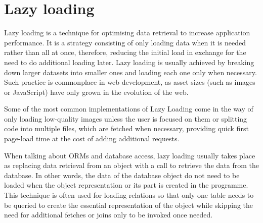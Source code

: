 \section{Lazy loading}
Lazy loading is a technique for optimising data retrieval to increase application performance. It is a strategy consisting of only loading data when it is needed rather than all at once, therefore, reducing the initial load in exchange for the need to do additional loading later. Lazy loading is usually achieved by breaking down larger datasets into smaller ones and loading each one only when necessary. Such practice is commonplace in web development, as asset sizes (such as images or JavaScript) have only grown in the evolution of the web.\par
Some of the most common implementations of Lazy Loading come in the way of only loading low-quality images unless the user is focused on them or splitting code into multiple files, which are fetched when necessary, providing quick first page-load time at the cost of adding additional requests.\par
When talking about ORMs and database access, lazy loading usually takes place as replacing data retrieval from an object with a call to retrieve the data from the database. In other words, the data of the database object do not need to be loaded when the object representation or its part is created in the programme. This technique is often used for loading relations so that only one table needs to be queried to create the essential representation of the object while skipping the need for additional fetches or joins only to be invoked once needed.\par

